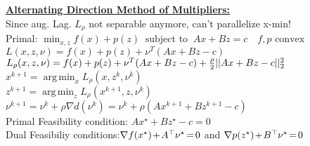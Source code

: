 \documentclass[a4paper,11pt]{article}
\newcommand{\argmin}{\operatorname*{arg\,min}}
\begin{document}
\begin{multicols}{2}
\underline{\textbf{Alternating Direction Method of Multipliers:}}\\
Since aug. Lag. $L_\rho$ not separable anymore, can't parallelize x-min!\\
Primal: $\min_{x, z} f(x) + p(z)\ \text{ subject to }\ Ax+Bz = c \quad f,p \text{ convex}$\\
$L(x, z, \nu) = f(x) + p(z)+ \nu^T (Ax+Bz-c)$\\
$L_\rho(x, z, \nu) = f(x) + p(z)+ \nu^T (Ax+Bz-c) + {\rho \over 2}||Ax + Bz- c||_2^2$\\
\hspace{0.2cm}$x^{k+1} = \argmin_x L_\rho (x, z^k, \nu^k)$\\
\hspace{0.2cm}$z^{k+1} = \argmin_z L_\rho(x^{k+1}, z, \nu^k)$\\
\hspace{0.2cm}$\nu^{k+1} = \nu^k + \rho \nabla d(\nu^k) = \nu^k + \rho(Ax^{k+1}+Bz^{k+1}-c)$\\
Primal Feasibility condition: $Ax^\star + Bz^\star - c = 0$\\
Dual Feasibiliy conditions:$\nabla f(x^\star) \hspace{-0.05cm} + \hspace{-0.05cm} A^\top \nu^\star \hspace{-0.05cm} = \hspace{-0.05cm} 0$ and $\nabla p(z^\star) \hspace{-0.05cm} + \hspace{-0.05cm} B^\top \nu^\star \hspace{-0.05cm} = \hspace{-0.05cm} 0$\\
\vspace{0.1cm}

\end{multicols}
\end{document}
